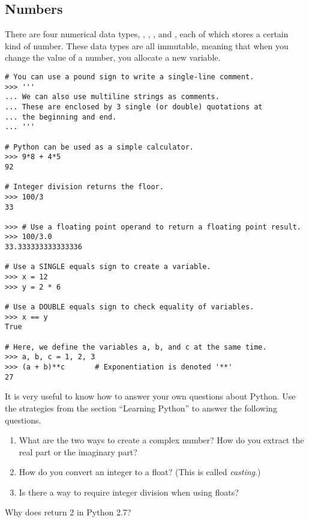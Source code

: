 \subsection*{Numbers}
\begin{example} There are four numerical data types, , , 
, and , each of which stores a certain kind of number. These data types are all immutable, meaning that when you change the value of a number, you allocate a new variable.

\begin{lstlisting}
# You can use a pound sign to write a single-line comment.
>>> '''
... We can also use multiline strings as comments. 
... These are enclosed by 3 single (or double) quotations at 
... the beginning and end. 
... '''

# Python can be used as a simple calculator.
>>> 9*8 + 4*5
92

# Integer division returns the floor.
>>> 100/3
33

>>> # Use a floating point operand to return a floating point result.
>>> 100/3.0
33.333333333333336

# Use a SINGLE equals sign to create a variable.
>>> x = 12
>>> y = 2 * 6

# Use a DOUBLE equals sign to check equality of variables.
>>> x == y
True

# Here, we define the variables a, b, and c at the same time.
>>> a, b, c = 1, 2, 3
>>> (a + b)**c       # Exponentiation is denoted '**'
27
\end{lstlisting}
\end{example}

\begin{problem}
It is very useful to know how to answer your own questions about Python. Use the strategies from the section ``Learning Python'' to answer the following questions.
\begin{enumerate}

\item What are the two ways to create a complex number? 
How do you extract the real part or the imaginary part?
\item How do you convert an integer to a float? (This is called \emph{casting}.)
\item Is there a way to require integer division when using floats?
\end{enumerate}
\end{problem}

\begin{problem}
Why does  return 2 in Python 2.7? 
\end{problem}

